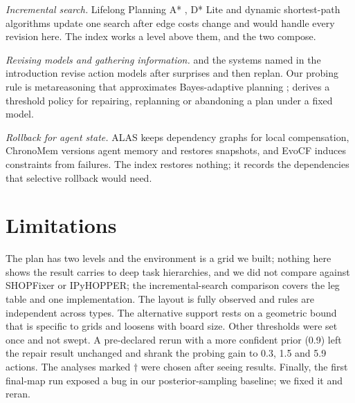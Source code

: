 \documentclass[letterpaper]{article}
\begin{document}
\emph{Incremental search.} Lifelong Planning A* \citep{koenig2004}, D* Lite \citep{koenig2002} and dynamic shortest-path algorithms \citep{ramalingam1996} update one search after edge costs change and would handle every revision here. The index works a level above them, and the two compose.

\emph{Revising models and gathering information.} \citet{weber2011} and the systems named in the introduction revise action models after surprises and then replan. Our probing rule is metareasoning \citep{russell1991,lin2015} that approximates Bayes-adaptive planning \citep{guez2012}; \citet{tewari2026} derives a threshold policy for repairing, replanning or abandoning a plan under a fixed model.

\emph{Rollback for agent state.} ALAS \citep{chang2025} keeps dependency graphs for local compensation, ChronoMem \citep{su2026} versions agent memory and restores snapshots, and EvoCF \citep{chi2026} induces constraints from failures. The index restores nothing; it records the dependencies that selective rollback would need.

\section{Limitations}

The plan has two levels and the environment is a grid we built; nothing here shows the result carries to deep task hierarchies, and we did not compare against SHOPFixer or IPyHOPPER; the incremental-search comparison covers the leg table and one implementation. The layout is fully observed and rules are independent across types. The alternative support rests on a geometric bound that is specific to grids and loosens with board size. Other thresholds were set once and not swept. A pre-declared rerun with a more confident prior (0.9) left the repair result unchanged and shrank the probing gain to 0.3, 1.5 and 5.9 actions. The analyses marked $\dagger$ were chosen after seeing results. Finally, the first final-map run exposed a bug in our posterior-sampling baseline; we fixed it and reran.


\end{document}
